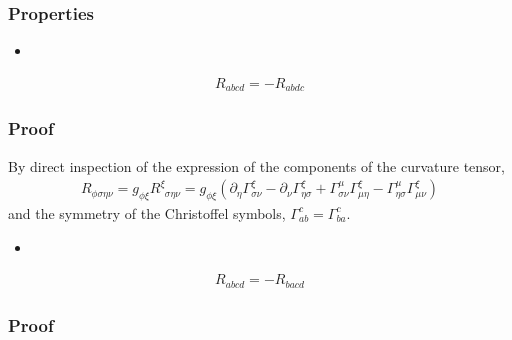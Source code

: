 \documentclass[letterpaper,10pt,english]{jupyterBook}
\begin{document}
\subsubsection{Properties}
\label{\detokenize{ch/relativity-general/differential-geometry:properties}}\label{\detokenize{ch/relativity-general/differential-geometry:relativity-general-notes-differential-geometry-curvature-tensor-properties}}\begin{itemize}
\item {} 
\end{itemize}
\begin{equation}\label{equation:ch/relativity-general/differential-geometry:eq:riemann:prop:1}
\begin{split}R_{abcd} = - R_{abdc}\end{split}
\end{equation}\subsubsection*{Proof}

\sphinxAtStartPar
By direct inspection of the expression of the components of the curvature tensor,
\begin{equation*}
\begin{split}R_{\phi \sigma \eta \nu} = g_{\phi \xi} R^{\xi}_{\ \ \sigma \eta \nu} = g_{\phi \xi} \left( \partial_{\eta} \Gamma_{\sigma \nu}^{\xi} - \partial_{\nu} \Gamma_{\eta \sigma}^{\xi} + \Gamma_{\sigma \nu}^{\mu} \Gamma_{\mu \eta}^{\xi} - \Gamma_{\eta \sigma}^{\mu} \Gamma_{\mu \nu}^{\xi}\right)\end{split}
\end{equation*}
\sphinxAtStartPar
and the symmetry of the Christoffel symbols, \(\Gamma_{ab}^c = \Gamma_{ba}^c\).
\begin{itemize}
\item {} 
\end{itemize}
\begin{equation}\label{equation:ch/relativity-general/differential-geometry:eq:riemann:prop:2}
\begin{split} R_{abcd} = - R_{bacd}\end{split}
\end{equation}\subsubsection*{Proof}
\end{document}
